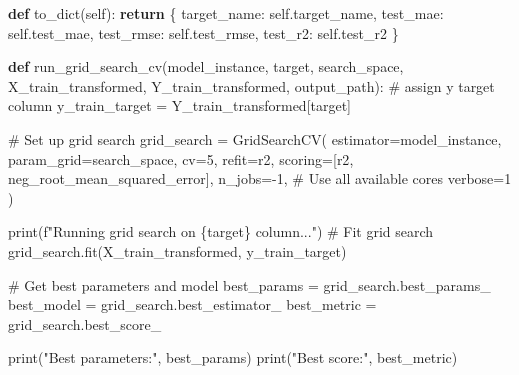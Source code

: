 \documentclass[
  letterpaper,
  DIV=11,
  numbers=noendperiod]{scrartcl}
\newenvironment{Shaded}{\begin{snugshade}}{\end{snugshade}}
\newcommand{\BuiltInTok}[1]{\textcolor[rgb]{0.00,0.23,0.31}{#1}}
\newcommand{\CommentTok}[1]{\textcolor[rgb]{0.37,0.37,0.37}{#1}}
\newcommand{\ControlFlowTok}[1]{\textcolor[rgb]{0.00,0.23,0.31}{\textbf{#1}}}
\newcommand{\DecValTok}[1]{\textcolor[rgb]{0.68,0.00,0.00}{#1}}
\newcommand{\KeywordTok}[1]{\textcolor[rgb]{0.00,0.23,0.31}{\textbf{#1}}}
\newcommand{\NormalTok}[1]{\textcolor[rgb]{0.00,0.23,0.31}{#1}}
\newcommand{\OperatorTok}[1]{\textcolor[rgb]{0.37,0.37,0.37}{#1}}
\newcommand{\SpecialCharTok}[1]{\textcolor[rgb]{0.37,0.37,0.37}{#1}}
\newcommand{\SpecialStringTok}[1]{\textcolor[rgb]{0.13,0.47,0.30}{#1}}
\newcommand{\StringTok}[1]{\textcolor[rgb]{0.13,0.47,0.30}{#1}}
\newcommand{\VariableTok}[1]{\textcolor[rgb]{0.07,0.07,0.07}{#1}}
\begin{document}
\begin{Shaded}
\begin{Highlighting}[]
    \KeywordTok{def}\NormalTok{ to\_dict(}\VariableTok{self}\NormalTok{):}
        \ControlFlowTok{return}\NormalTok{ \{}
            \StringTok{\textquotesingle{}target\_name\textquotesingle{}}\NormalTok{: }\VariableTok{self}\NormalTok{.target\_name,}
            \StringTok{\textquotesingle{}test\_mae\textquotesingle{}}\NormalTok{: }\VariableTok{self}\NormalTok{.test\_mae,}
            \StringTok{\textquotesingle{}test\_rmse\textquotesingle{}}\NormalTok{: }\VariableTok{self}\NormalTok{.test\_rmse,}
            \StringTok{\textquotesingle{}test\_r2\textquotesingle{}}\NormalTok{: }\VariableTok{self}\NormalTok{.test\_r2}
\NormalTok{        \}}


\KeywordTok{def}\NormalTok{ run\_grid\_search\_cv(model\_instance, target, search\_space, X\_train\_transformed, Y\_train\_transformed, output\_path):}
    \CommentTok{\# assign y target column}
\NormalTok{    y\_train\_target }\OperatorTok{=}\NormalTok{ Y\_train\_transformed[target]}
    
    \CommentTok{\# Set up grid search}
\NormalTok{    grid\_search }\OperatorTok{=}\NormalTok{ GridSearchCV(}
\NormalTok{    estimator}\OperatorTok{=}\NormalTok{model\_instance,}
\NormalTok{    param\_grid}\OperatorTok{=}\NormalTok{search\_space,}
\NormalTok{    cv}\OperatorTok{=}\DecValTok{5}\NormalTok{,}
\NormalTok{    refit}\OperatorTok{=}\StringTok{\textquotesingle{}r2\textquotesingle{}}\NormalTok{,}
\NormalTok{    scoring}\OperatorTok{=}\NormalTok{[}\StringTok{\textquotesingle{}r2\textquotesingle{}}\NormalTok{, }\StringTok{\textquotesingle{}neg\_root\_mean\_squared\_error\textquotesingle{}}\NormalTok{],}
\NormalTok{    n\_jobs}\OperatorTok{={-}}\DecValTok{1}\NormalTok{,  }\CommentTok{\# Use all available cores}
\NormalTok{    verbose}\OperatorTok{=}\DecValTok{1}
\NormalTok{    )}
    
    \BuiltInTok{print}\NormalTok{(}\SpecialStringTok{f"Running grid search on }\SpecialCharTok{\{}\NormalTok{target}\SpecialCharTok{\}}\SpecialStringTok{ column..."}\NormalTok{)}
    \CommentTok{\# Fit grid search}
\NormalTok{    grid\_search.fit(X\_train\_transformed, y\_train\_target)}

    \CommentTok{\# Get best parameters and model}
\NormalTok{    best\_params }\OperatorTok{=}\NormalTok{ grid\_search.best\_params\_}
\NormalTok{    best\_model }\OperatorTok{=}\NormalTok{ grid\_search.best\_estimator\_}
\NormalTok{    best\_metric }\OperatorTok{=}\NormalTok{ grid\_search.best\_score\_}

    \BuiltInTok{print}\NormalTok{(}\StringTok{"Best parameters:"}\NormalTok{, best\_params)}
    \BuiltInTok{print}\NormalTok{(}\StringTok{"Best score:"}\NormalTok{, best\_metric)}


\end{Highlighting}
\end{Shaded}
\end{document}
